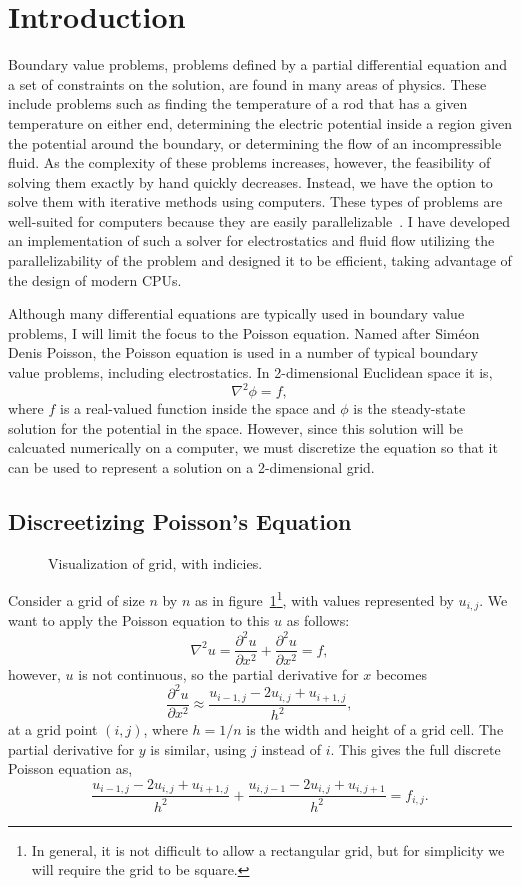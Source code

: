 \section{Introduction}

Boundary value problems, problems defined by a partial differential equation and a set of
constraints on the solution, are found in many areas of physics. These include problems
such as finding the temperature of a rod that has a given temperature on either end,
determining the electric potential inside a region given the potential around the
boundary, or determining the flow of an incompressible fluid. As the complexity of 
these problems increases, however, the feasibility of solving them exactly by hand
quickly decreases. Instead, we have the option to solve them with iterative methods
using computers. These types of problems are well-suited for computers because
they are easily parallelizable~\cite{parallel}. I have developed an
implementation of such a solver for electrostatics and fluid flow utilizing the 
parallelizability of the problem and designed it to be efficient, taking advantage 
of the design of modern CPUs.

Although many differential equations are typically used in boundary value problems,
I will limit the focus to the Poisson equation. Named after Siméon Denis Poisson, the Poisson equation
is used in a number of typical boundary value problems, including electrostatics.
In 2-dimensional Euclidean space it is\cite{boas},
$$\nabla^2 \phi = f,$$
where $f$ is a real-valued function inside the space and $\phi$ is the steady-state
solution for the potential in the space. However, since this solution will be calcuated
numerically on a computer, we must discretize the equation so that it can be used to
represent a solution on a 2-dimensional grid.

\subsection{Discreetizing Poisson's Equation}

\begin{figure}[htb]
	\centering
	
	\caption{Visualization of grid, with indicies.}
\label{grid}
\end{figure}

Consider a grid of size $n$ by $n$ as in figure~\ref{grid}\footnote{In general, it is not difficult to allow a rectangular grid, but for simplicity
we will require the grid to be square.}, with values represented by $u_{i,j}$. We want to apply the Poisson equation to
this $u$ as follows:
$$\nabla^2 u = \frac{\partial^2 u}{\partial x^2} + \frac{\partial^2 u}{\partial x^2} = f,$$
however, $u$ is not continuous, so the partial derivative for $x$ becomes
$$\frac{\partial^2 u}{\partial x^2} \approx \frac{u_{i-1,j} - 2 u_{i,j} + u_{i+1,j}}{h^2},$$
at a grid point $(i,j)$, where $h = 1 / n$ is the width and height of a grid cell. The partial derivative for $y$ is similar, using $j$ instead of $i$.
This gives the full discrete Poisson equation as\cite{poisson-relax}\cite{myths},
$$\frac{u_{i-1,j} - 2 u_{i,j} + u_{i+1,j}}{h^2} + \frac{u_{i,j-1} - 2 u_{i,j} + u_{i,j+1}}{h^2} = f_{i,j}.$$

